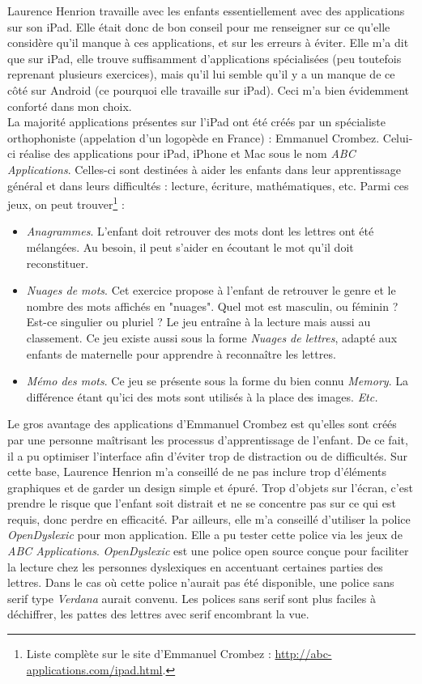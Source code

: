 Laurence Henrion travaille avec les enfants essentiellement avec des applications sur son iPad. Elle était donc de bon conseil pour me renseigner sur ce qu'elle considère qu'il manque à ces applications, et sur les erreurs à éviter. Elle m'a dit que sur iPad, elle trouve suffisamment d'applications spécialisées (peu toutefois reprenant plusieurs exercices), mais qu'il lui semble qu'il y a un manque de ce côté sur Android (ce pourquoi elle travaille sur iPad). Ceci m'a bien évidemment conforté dans mon choix.\\

La majorité applications présentes sur l'iPad ont été créés par un spécialiste orthophoniste (appelation d'un logopède en France) : Emmanuel Crombez. Celui-ci réalise des applications pour iPad, iPhone et Mac sous le nom \textit{ABC Applications}. Celles-ci sont destinées à aider les enfants dans leur apprentissage général et dans leurs difficultés : lecture, écriture, mathématiques, etc. Parmi ces jeux, on peut trouver\footnote{Liste complète sur le site d'Emmanuel Crombez : \url{http://abc-applications.com/ipad.html}.} :
\begin{itemize}
\item \textit{Anagrammes}. L'enfant doit retrouver des mots dont les lettres ont été mélangées. Au besoin, il peut s'aider en écoutant le mot qu'il doit reconstituer.
\item \textit{Nuages de mots}. Cet exercice propose à l'enfant de retrouver le genre et le nombre des mots affichés en "nuages". Quel mot est masculin, ou féminin ? Est-ce singulier ou pluriel ? Le jeu entraîne à la lecture mais aussi au classement. Ce jeu existe aussi sous la forme \textit{Nuages de lettres}, adapté aux enfants de maternelle pour apprendre à reconnaître les lettres.
\item \textit{Mémo des mots}. Ce jeu se présente sous la forme du bien connu \textit{Memory}. La différence étant qu'ici des mots sont utilisés à la place des images.
\textit{Etc.}\\

\end{itemize}
Le gros avantage des applications d'Emmanuel Crombez est qu'elles sont créés par une personne maîtrisant les processus d'apprentissage de l'enfant. De ce fait, il a pu optimiser l'interface afin d'éviter trop de distraction ou de difficultés. Sur cette base, Laurence Henrion m'a conseillé de ne pas inclure trop d'éléments graphiques et de garder un design simple et épuré. Trop d'objets sur l'écran, c'est prendre le risque que l'enfant soit distrait et ne se concentre pas sur ce qui est requis, donc perdre en efficacité. Par ailleurs, elle m'a conseillé d'utiliser la police \textit{OpenDyslexic} pour mon application. Elle a pu tester cette police via les jeux de \textit{ABC Applications}. \textit{OpenDyslexic} est une police open source conçue pour faciliter la lecture chez les personnes dyslexiques en accentuant certaines parties des lettres. Dans le cas où cette police n'aurait pas été disponible, une police sans serif type \textit{Verdana} aurait convenu. Les polices sans serif sont plus faciles à déchiffrer, les pattes des lettres avec serif encombrant la vue.\\

